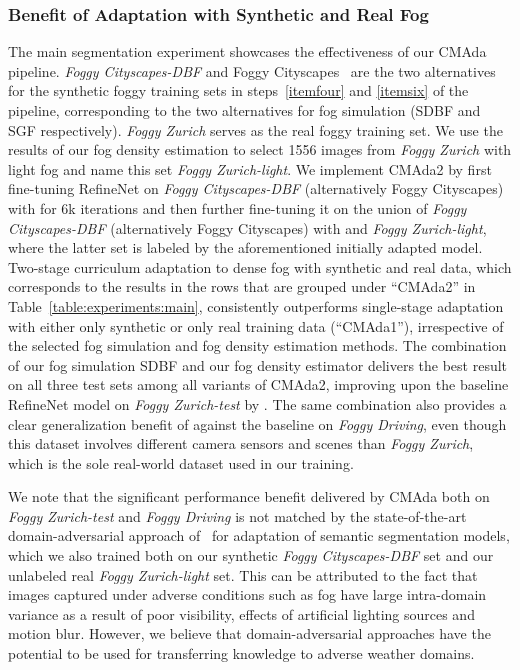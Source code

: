 \documentclass[twocolumn]{svjour3}          \smartqed  \usepackage{graphicx}
\begin{document}
\subsubsection{Benefit of Adaptation with Synthetic and Real Fog}
\label{sec:experiments:curriculum}





The main segmentation experiment showcases the effectiveness of our CMAda pipeline. \emph{Foggy Cityscapes-DBF} and Foggy Cityscapes~\cite{SFSU_synthetic} are the two alternatives for the synthetic foggy training sets in steps~\ref{itemfour} and \ref{itemsix} of the pipeline, corresponding to the two alternatives for fog simulation (SDBF and SGF respectively). \emph{Foggy Zurich} serves as the real foggy training set. We use the results of our fog density estimation to select 1556 images from \emph{Foggy Zurich} with light fog and name this set \emph{Foggy Zurich-light}. We implement CMAda2 by first fine-tuning RefineNet on \emph{Foggy Cityscapes-DBF} (alternatively Foggy Cityscapes) with  for 6k iterations and then further fine-tuning it on the union of \emph{Foggy Cityscapes-DBF} (alternatively Foggy Cityscapes) with  and \emph{Foggy Zurich-light}, where the latter set is labeled by the aforementioned initially adapted model. Two-stage curriculum adaptation to dense fog with synthetic and real data, which corresponds to the results in the rows that are grouped under ``CMAda2'' in Table~\ref{table:experiments:main}, consistently outperforms single-stage adaptation with either only synthetic or only real training data (``CMAda1''), irrespective of the selected fog simulation and fog density estimation methods. The combination of our fog simulation SDBF and our fog density estimator delivers the best result on all three test sets among all variants of CMAda2, improving upon the baseline RefineNet model on \emph{Foggy Zurich-test} by . The same combination also provides a clear generalization benefit of  against the baseline on \emph{Foggy Driving}, even though this dataset involves different camera sensors and scenes than \emph{Foggy Zurich}, which is the sole real-world dataset used in our training. 

We note that the significant performance benefit delivered by CMAda both on \emph{Foggy Zurich-test} and \emph{Foggy Driving} is not matched by the state-of-the-art domain-adversarial approach of~\cite{AdaptSegNet} for adaptation of semantic segmentation models, which we also trained both on our synthetic \emph{Foggy Cityscapes-DBF} set and our unlabeled real \emph{Foggy Zurich-light} set. This can be attributed to the fact that images captured under adverse conditions such as fog have large intra-domain variance as a result of poor visibility, effects of artificial lighting sources and motion blur. However, we believe that domain-adversarial approaches have the potential to be used for transferring knowledge to adverse weather domains.
\end{document}
